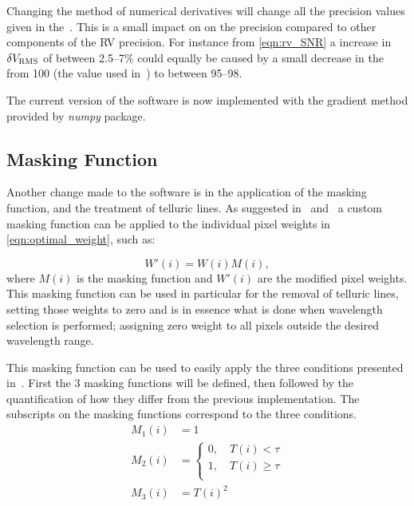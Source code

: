 {Changing the method of numerical derivatives will change all the precision values given in the~\citet{figueira_radial_2016}.
This is a small impact on on the precision compared to other components of the {RV} precision.
For instance from \cref{eqn:rv_SNR} a increase in \(\delta V_{\textrm{RMS}}\) of between 2.5--7\%  could equally be caused by a small decrease in the \snr{} from 100 (the value used in~\citet{figueira_radial_2016}) to between 95--98.

The current version of the software is now implemented with the gradient method provided by \emph{numpy} package.

\subsection{Masking Function}
\label{subsec:masking_function}
Another change made to the software is in the application of the masking function, and the treatment of telluric lines.
As suggested in~\citet{connes_absolute_1985} and~\citet{bouchy_fundamental_2001} a custom masking function can be applied to the individual pixel weights in \cref{eqn:optimal_weight}, such as:

\[W'(i) = W(i)M(i),\label{eqn:mask_function}\] where \(M(i)\) is the masking function and \(W'(i)\) are the modified pixel weights.
This masking function can be used in particular for the removal of telluric lines, setting those weights to zero and is in essence what is done when wavelength selection is performed; assigning zero weight to all pixels outside the desired wavelength range.

This masking function can be used to easily apply the three conditions presented in~\citet{figueira_radial_2016}.
First the 3 masking functions will be defined, then followed by the quantification of how they differ from the previous implementation.
The subscripts on the masking functions correspond to the three conditions.
\begin{align}
M_1(i) &= 1 \label{eqn:mask1}\\
M_2(i) &= \begin{cases}
0, \hspace{1em} T(i) < \tau\\
1, \hspace{1em} T(i) \ge \tau\\
\end{cases}\label{eqn:mask2}\\
M_3(i) &= {T(i)}^{2} \label{eqn:mask3}
\end{align}

}
